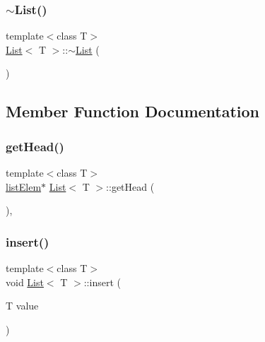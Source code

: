 \mbox{\label{class_list_a2b58189090f6e5ce52939c9195e59e85}} 
\subsubsection{\texorpdfstring{$\sim$\+List()}{~List()}}
{\footnotesize\ttfamily template$<$class T$>$ \\
\hyperlink{class_list}{List}$<$ T $>$\+::$\sim$\hyperlink{class_list}{List} (\begin{DoxyParamCaption}{ }\end{DoxyParamCaption})\hspace{0.3cm}{\ttfamily [inline]}}



\subsection{Member Function Documentation}
\mbox{\label{class_list_a920e07d6f0047af1404e251a58adb4c2}} 
\subsubsection{\texorpdfstring{get\+Head()}{getHead()}}
{\footnotesize\ttfamily template$<$class T$>$ \\
\hyperlink{struct_list_1_1list_elem}{list\+Elem}$\ast$ \hyperlink{class_list}{List}$<$ T $>$\+::get\+Head (\begin{DoxyParamCaption}{ }\end{DoxyParamCaption})\hspace{0.3cm}{\ttfamily [inline]}, {\ttfamily [protected]}}

\mbox{\label{class_list_afea509b891b4541319974ea062e56d14}} 
\subsubsection{\texorpdfstring{insert()}{insert()}}
{\footnotesize\ttfamily template$<$class T$>$ \\
void \hyperlink{class_list}{List}$<$ T $>$\+::insert (\begin{DoxyParamCaption}\item[{T}]{value }\end{DoxyParamCaption})\hspace{0.3cm}{\ttfamily [inline]}}

